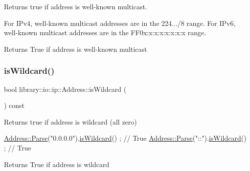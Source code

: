 Returns true if address is well-\/known multicast. 

For I\+Pv4, well-\/known multicast addresses are in the 224.../8 range. For I\+Pv6, well-\/known multicast addresses are in the F\+F0x\+:x\+:x\+:x\+:x\+:x\+:x\+:x range.

\begin{DoxyReturn}{Returns}
True if address is well-\/known multicast 
\end{DoxyReturn}
\mbox{\label{classlibrary_1_1io_1_1ip_1_1_address_a228663b61e067424cceedc640ae44bb8}} 
\subsubsection{\texorpdfstring{is\+Wildcard()}{isWildcard()}}
{\footnotesize\ttfamily bool library\+::io\+::ip\+::\+Address\+::is\+Wildcard (\begin{DoxyParamCaption}{ }\end{DoxyParamCaption}) const}



Returns true if address is wildcard (all zero) 


\begin{DoxyCode}
\hyperlink{classlibrary_1_1io_1_1ip_1_1_address_af8ab0e365de3c00109b456ee94e2590b}{Address::Parse}(\textcolor{stringliteral}{"0.0.0.0"}).\hyperlink{classlibrary_1_1io_1_1ip_1_1_address_a228663b61e067424cceedc640ae44bb8}{isWildcard}() ; \textcolor{comment}{// True}
\hyperlink{classlibrary_1_1io_1_1ip_1_1_address_af8ab0e365de3c00109b456ee94e2590b}{Address::Parse}(\textcolor{stringliteral}{"::"}).\hyperlink{classlibrary_1_1io_1_1ip_1_1_address_a228663b61e067424cceedc640ae44bb8}{isWildcard}() ; \textcolor{comment}{// True}
\end{DoxyCode}


\begin{DoxyReturn}{Returns}
True if address is wildcard 
\end{DoxyReturn}
\mbox{\label{classlibrary_1_1io_1_1ip_1_1_address_a79cb92d3917c101f3908ce6f251fffd7}} 
